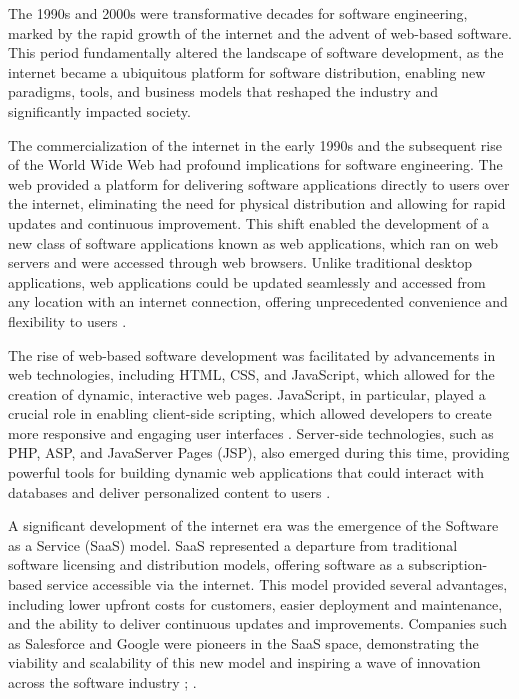 \begin{refsection}
The 1990s and 2000s were transformative decades for software engineering, marked by the rapid growth of the internet and the advent of web-based software. This period fundamentally altered the landscape of software development, as the internet became a ubiquitous platform for software distribution, enabling new paradigms, tools, and business models that reshaped the industry and significantly impacted society.

The commercialization of the internet in the early 1990s and the subsequent rise of the World Wide Web had profound implications for software engineering. The web provided a platform for delivering software applications directly to users over the internet, eliminating the need for physical distribution and allowing for rapid updates and continuous improvement. This shift enabled the development of a new class of software applications known as web applications, which ran on web servers and were accessed through web browsers. Unlike traditional desktop applications, web applications could be updated seamlessly and accessed from any location with an internet connection, offering unprecedented convenience and flexibility to users \cite[pp.~45-47]{pressman2019software}.

The rise of web-based software development was facilitated by advancements in web technologies, including HTML, CSS, and JavaScript, which allowed for the creation of dynamic, interactive web pages. JavaScript, in particular, played a crucial role in enabling client-side scripting, which allowed developers to create more responsive and engaging user interfaces \cite[pp.~25-28]{flanagan2020javascript}. Server-side technologies, such as PHP, ASP, and JavaServer Pages (JSP), also emerged during this time, providing powerful tools for building dynamic web applications that could interact with databases and deliver personalized content to users \cite[pp.~45-48]{gosling2014java}.

A significant development of the internet era was the emergence of the Software as a Service (SaaS) model. SaaS represented a departure from traditional software licensing and distribution models, offering software as a subscription-based service accessible via the internet. This model provided several advantages, including lower upfront costs for customers, easier deployment and maintenance, and the ability to deliver continuous updates and improvements. Companies such as Salesforce and Google were pioneers in the SaaS space, demonstrating the viability and scalability of this new model and inspiring a wave of innovation across the software industry \cite[pp.~89-91]{benioff2009behind}; \cite[pp.~103-106]{schmidt2015google}.


\end{refsection}
